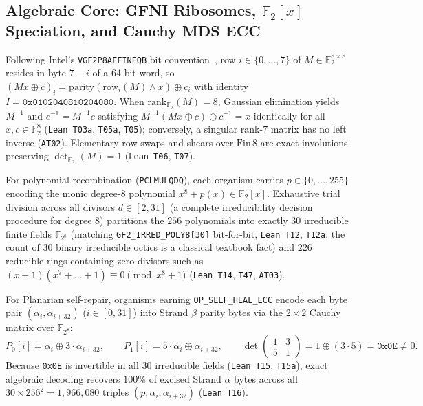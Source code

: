 \documentclass[11pt,reqno]{amsart}
\theoremstyle{plain}
\theoremstyle{definition}
\theoremstyle{remark}
\newcommand{\code}[1]{{\footnotesize\nolinkurl{#1}}}
\begin{document}
\subsection{Algebraic Core: GFNI Ribosomes, $\mathbb{F}_2[x]$ Speciation, and Cauchy MDS ECC}
Following Intel's \code{VGF2P8AFFINEQB} bit convention~\cite{intel2024sdm}, row $i \in \{0,\dots,7\}$ of $M \in \mathbb{F}_2^{8\times 8}$ resides in byte $7-i$ of a $64$-bit word, so $(Mx \oplus c)_i = \mathrm{parity}(\mathrm{row}_i(M) \wedge x) \oplus c_i$ with identity $I = \texttt{0x0102040810204080}$. When $\mathrm{rank}_{\mathbb{F}_2}(M)=8$, Gaussian elimination yields $M^{-1}$ and $c^{-1} = M^{-1} c$ satisfying $M^{-1}(Mx \oplus c) \oplus c^{-1} = x$ identically for all $x,c \in \mathbb{F}_2^8$ (\code{Lean T03a}, \code{T05a}, \code{T05}); conversely, a singular rank-$7$ matrix has no left inverse (\code{AT02}). Elementary row swaps and shears over $\mathrm{Fin}\,8$ are exact involutions preserving $\det_{\mathbb{F}_2}(M)=1$ (\code{Lean T06}, \code{T07}).

For polynomial recombination (\code{PCLMULQDQ}), each organism carries $p \in \{0,\dots,255\}$ encoding the monic degree-$8$ polynomial $x^8 + p(x) \in \mathbb{F}_2[x]$. Exhaustive trial division across all divisors $d \in [2,31]$ (a complete irreducibility decision procedure for degree $8$) partitions the $256$ polynomials into exactly $30$ irreducible finite fields $\mathbb{F}_{2^8}$ (matching \code{GF2_IRRED_POLY8[30]} bit-for-bit, \code{Lean T12}, \code{T12a}; the count of $30$ binary irreducible octics is a classical textbook fact) and $226$ reducible rings containing zero divisors such as $(x+1)(x^7+\dots+1) \equiv 0 \pmod{x^8+1}$ (\code{Lean T14}, \code{T47}, \code{AT03}).

For Planarian self-repair, organisms earning \code{OP_SELF_HEAL_ECC} encode each byte pair $(\alpha_i, \alpha_{i+32})$ ($i \in [0,31]$) into Strand $\beta$ parity bytes via the $2 \times 2$ Cauchy matrix over $\mathbb{F}_{2^8}$:
\begin{equation}
  P_0[i] = \alpha_i \oplus 3 \cdot \alpha_{i+32}, \qquad
  P_1[i] = 5 \cdot \alpha_i \oplus \alpha_{i+32}, \qquad
  \det \begin{pmatrix} 1 & 3 \\ 5 & 1 \end{pmatrix} = 1 \oplus (3 \cdot 5) = \texttt{0x0E} \ne 0.
  \label{eq:cauchy}
\end{equation}
Because \code{0x0E} is invertible in all $30$ irreducible fields (\code{Lean T15}, \code{T15a}), exact algebraic decoding recovers $100\%$ of excised Strand $\alpha$ bytes across all $30 \times 256^2 = 1{,}966{,}080$ triples $(p, \alpha_i, \alpha_{i+32})$ (\code{Lean T16}).
\end{document}
